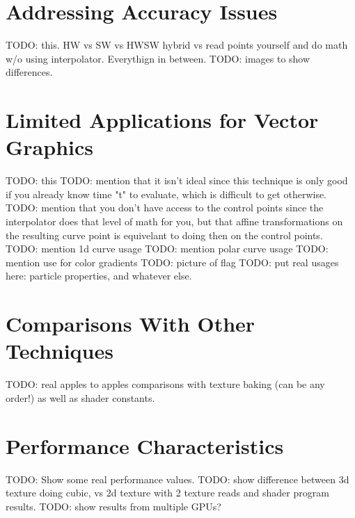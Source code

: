 \documentclass{jcgt}
\begin{document}
\section{Addressing Accuracy Issues}
\label{sec:addressingaccuracyissues}

TODO: this. HW vs SW vs HWSW hybrid vs read points yourself and do math w/o using interpolator. Everythign in between.
TODO: images to show differences.

\section{Limited Applications for Vector Graphics}
\label{sec:limitedapplicationsforvectorgraphics}

TODO: this
TODO: mention that it isn't ideal since this technique is only good if you already know time "t" to evaluate, which is difficult to get otherwise.
TODO: mention that you don't have access to the control points since the interpolator does that level of math for you, but that affine transformations on the resulting curve point is equivelant to doing then on the control points.
TODO: mention 1d curve usage
TODO: mention polar curve usage
TODO: mention use for color gradients
TODO: picture of flag
TODO: put real usages here: particle properties, and whatever else.


\section{Comparisons With Other Techniques}
\label{sec:comparisonswithothertechniques}

TODO: real apples to apples comparisons with texture baking (can be any order!) as well as shader constants.

\section{Performance Characteristics}
\label{sec:performancecharacteristics}

TODO: Show some real performance values. 
TODO: show difference between 3d texture doing cubic, vs 2d texture with 2 texture reads and shader program results.
TODO: show results from multiple GPUs?

\end{document}
